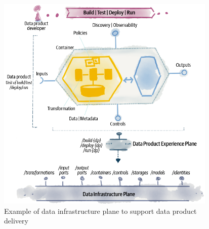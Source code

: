 \documentclass[12pt, a4paper]{book}
\begin{document}
\begin{figure}[h]
	\begin{framed}
		\centering
		\vspace*{-.3cm}
		\includegraphics[width=10.5cm]{DataInfras.png}
		\caption{Example of data infrastructure plane to support data product delivery}
		\label{DataInfras}
	\end{framed}
\end{figure}
\end{document}
